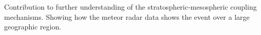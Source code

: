Contribution to further understanding of the stratospheric-mesospheric coupling mechanisms. Showing how the meteor radar data shows the event over a large geographic region.